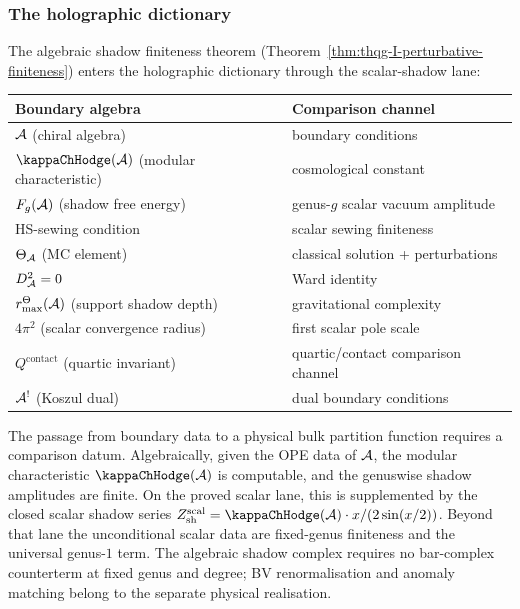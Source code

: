 \subsubsection{The holographic dictionary}

\begin{remark}
The algebraic shadow finiteness theorem
(Theorem~\ref{thm:thqg-I-perturbative-finiteness}) enters the
holographic dictionary through the scalar-shadow lane:
\begin{center}
\renewcommand{\arraystretch}{1.3}
\begin{tabular}{l|l}
\textbf{Boundary algebra} & \textbf{Comparison channel} \\
\hline
$\mathcal{A}$ (chiral algebra) & boundary conditions \\
$\kappaChHodge(\cA)$ (modular characteristic) & cosmological constant \\
$F_g(\mathcal{A})$ (shadow free energy) & genus-$g$ scalar vacuum amplitude \\
HS-sewing condition & scalar sewing finiteness \\
$\Theta_{\mathcal{A}}$ (MC element) & classical solution + perturbations \\
$D_{\mathcal{A}}^2 = 0$ & Ward identity \\
\(r^\Theta_{\max}(\mathcal{A})\) (support shadow depth) & gravitational complexity \\
$4\pi^2$ (scalar convergence radius) & first scalar pole scale \\
$Q^{\mathrm{contact}}$ (quartic invariant) & quartic/contact comparison channel \\
$\mathcal{A}^!$ (Koszul dual) & dual boundary conditions \\
\end{tabular}
\end{center}
The passage from boundary data to a physical bulk partition function
requires a comparison datum. Algebraically, given the OPE data of
$\mathcal{A}$, the modular characteristic $\kappaChHodge(\cA)$ is computable,
and the genuswise shadow amplitudes are finite. On the proved scalar
lane, this is supplemented by the closed scalar shadow series
$Z_{\mathrm{sh}}^{\mathrm{scal}}
= \kappaChHodge(\cA)\cdot x/(2\sin(x/2))$. Beyond that lane the
unconditional scalar data are fixed-genus finiteness and the universal
genus-$1$ term. The algebraic shadow complex requires no bar-complex
counterterm at fixed genus and degree; BV renormalisation and anomaly
matching belong to the separate physical realisation.
\end{remark}

